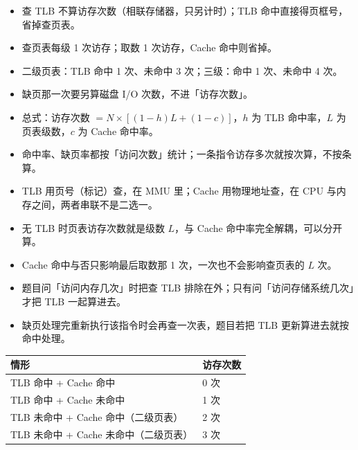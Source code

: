 \documentclass[10pt,a4paper]{ctexart}
\begin{document}
\begin{itemize}

\item 查 TLB 不算访存次数（相联存储器，只另计时）；TLB 命中直接得页框号，省掉查页表。

\item 查页表每级 1 次访存；取数 1 次访存，Cache 命中则省掉。

\item 二级页表：TLB 命中 1 次、未命中 3 次；三级：命中 1 次、未命中 4 次。

\item 缺页那一次要另算磁盘 I/O 次数，不进「访存次数」。

\item 总式：访存次数 $=N\times[(1-h)L+(1-c)]$，$h$ 为 TLB 命中率，$L$ 为页表级数，$c$ 为 Cache 命中率。

\item 命中率、缺页率都按「访问次数」统计；一条指令访存多次就按次算，不按条算。

\item TLB 用页号（标记）查，在 MMU 里；Cache 用物理地址查，在 CPU 与内存之间，两者串联不是二选一。

\item 无 TLB 时页表访存次数就是级数 $L$，与 Cache 命中率完全解耦，可以分开算。

\item Cache 命中与否只影响最后取数那 1 次，一次也不会影响查页表的 $L$ 次。

\item 题目问「访问内存几次」时把查 TLB 排除在外；只有问「访问存储系统几次」才把 TLB 一起算进去。

\item 缺页处理完重新执行该指令时会再查一次表，题目若把 TLB 更新算进去就按命中处理。

\end{itemize}

\begin{center}\small
\begin{tabularx}{\linewidth}{@{}>{\raggedright\arraybackslash}Xl@{}}
\toprule
情形 & 访存次数 \\
\midrule
TLB 命中 + Cache 命中 & 0 次 \\
TLB 命中 + Cache 未命中 & 1 次 \\
TLB 未命中 + Cache 命中（二级页表） & 2 次 \\
TLB 未命中 + Cache 未命中（二级页表） & 3 次 \\
\bottomrule
\end{tabularx}
\end{center}
\end{document}
